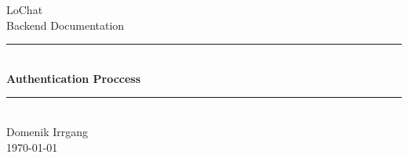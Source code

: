 \documentclass[12pt,a4]{article}
\begin{document}
\begin{titlepage}

\newcommand{\HRule}{\rule{\linewidth}{0.5mm}} %

\center %


\vspace{10cm}
 

{\Huge LoChat}\\[2.5cm] %
{\Large Backend Documentation}\\[3.5cm] %


\HRule \\[0.6cm]
{ \huge \bfseries Authentication Proccess}\\[0.2cm] %
\HRule \\[3.5cm]



{\large Domenik Irrgang \\ \today}\\[4cm] %

 

\vfill %

\end{titlepage}
\pagestyle{plain}

%

\tableofcontents
\newpage
{} 
\listoffigures
{}
\newpage


\pagestyle{fancyplain}
\setcounter{page}{1}




\end{document}
